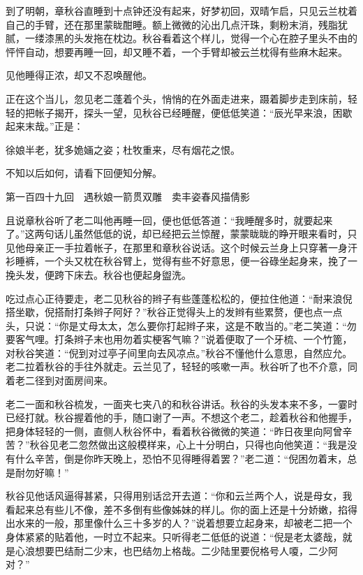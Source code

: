\documentclass[12pt,UTF8]{ctexbook}
\begin{document}
{{{到了明朝，章秋谷直睡到十点钟还没有起来，好梦初回，双晴乍启，只见云兰枕着自己的手臂，还在那里蒙眬酣睡。额上微微的沁出几点汗珠，剩粉末消，残脂犹腻，一缕漆黑的头发拖在枕边。秋谷看着这个样儿，觉得一个心在腔子里头不由的怦怦自动，想要再睡一回，却又睡不着，一个手臂却被云兰枕得有些麻木起来。

见他睡得正浓，却又不忍唤醒他。

正在这个当儿，忽见老二蓬着个头，悄悄的在外面走进来，蹑着脚步走到床前，轻轻的把帐子揭开，探头一望，见秋谷已经睡醒，便低低笑道：“辰光早来浪，困歇起来末哉。”正是：

徐娘半老，犹多姽婳之姿；杜牧重来，尽有烟花之恨。

不知以后如何，请看下回便知分解。





第一百四十九回　遇秋娘一箭贯双雕　卖丰姿春风描倩影





且说章秋谷听了老二叫他再睡一回，便也低低答道：“我睡醒多时，就要起来了。”这两句话儿虽然低低的说，却已经把云兰惊醒，蒙蒙眬眬的睁开眼来看时，只见他母亲正一手拉着帐子，在那里和章秋谷说话。这个时候云兰身上只穿著一身汗衫睡裤，一个头又枕在秋谷臂上，觉得有些不好意思，便一谷碌坐起身来，挽了一挽头发，便跨下床去。秋谷也便起身盥洗。

吃过点心正待要走，老二见秋谷的辫子有些蓬蓬松松的，便拉住他道：“耐来浪倪搭坐歇，倪搭耐打条辫子阿好？”秋谷正觉得头上的发辫有些累赘，便也点一点头，只说：“你是丈母太太，怎么要你打起辫子来，这是不敢当的。”老二笑道：“勿要客气哩。打条辫子末也用勿着实梗客气嘛？”说着便取了一个牙梳、一个竹篦，对秋谷笑道：“倪到对过亭子间里向去风凉点。”秋谷不懂他什么意思，自然应允。老二拉着秋谷的手往外就走。云兰见了，轻轻的咳嗽一声。秋谷听了也不介意，同着老二径到对面房间来。

老二一面和秋谷梳发，一面夹七夹八的和秋谷讲话。秋谷的头发本来不多，一霎时已经打就。秋谷握着他的手，随口谢了一声。不想这个老二，趁着秋谷和他握手，把身体轻轻的一侧，直侧人秋谷怀中，看着秋谷微微的笑道：“昨日夜里向阿曾辛苦？”秋谷见老二忽然做出这般模样来，心上十分明白，只得也向他笑道：“我是没有什么辛苦，倒是你昨天晚上，恐怕不见得睡得着罢？”老二道：“倪困勿着末，总是耐勿好嘛！”

秋谷见他话风逼得甚紧，只得用别话岔开去道：“你和云兰两个人，说是母女，我看起来总有些儿不像，差不多倒有些像姊妹的样儿。你的面上还是十分娇嫩，掐得出水来的一般，那里像什么三十多岁的人？”说着想要立起身来，却被老二把一个身体紧紧的贴着他，一时立不起来。只听得老二低低的说道：“倪是老太婆哉，就是心浪想要巴结耐二少末，也巴结勿上格哉。二少陆里要倪格号人嗄，二少阿对？”

}}}
\end{document}
